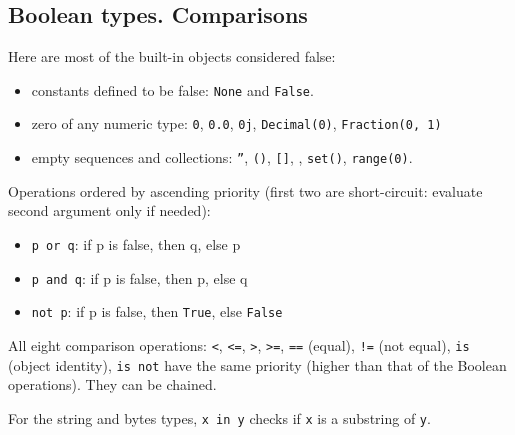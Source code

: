 \subsection{Boolean types. Comparisons}
Here are most of the built-in objects considered false:
\begin{itemize}
\item constants defined to be false: \texttt{None} and \texttt{False}.
\item zero of any numeric type: \texttt{0}, \texttt{0.0}, \texttt{0j}, \texttt{Decimal(0)}, \texttt{Fraction(0, 1)}
\item empty sequences and collections: \texttt{''}, \texttt{()}, \texttt{[]}, \texttt{{}}, \texttt{set()}, \texttt{range(0)}.
\end{itemize}


Operations ordered by ascending priority (first two are short-circuit: evaluate second argument only if needed):
\begin{itemize}
	\item \texttt{p or q}: if p is false, then q, else p
	\item \texttt{p and q}: if p is false, then p, else q
	\item \texttt{not p}: if p is false, then \texttt{True}, else \texttt{False}
\end{itemize}

All eight comparison operations:
\texttt{<},
\texttt{<=},
\texttt{>},
\texttt{>=},
\texttt{==} (equal),
\texttt{!=} (not equal),
\texttt{is} (object identity),
\texttt{is not}
have the same priority (higher than that of the Boolean operations).
They can be chained.

For the string and bytes types, \texttt{x in y} checks if \texttt{x} is a substring of \texttt{y}.

%
